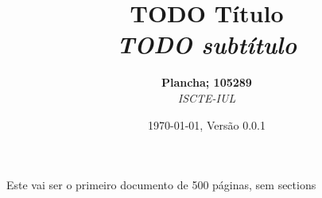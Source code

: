 \documentclass[12pt]{diazessay}
\title{\textbf{TODO Título} \\ {\Large\itshape TODO subtítulo}}
\author{\textbf{Plancha; 105289} \\ \textit{ISCTE-IUL}}
\date{\today , Versão 0.0.1}
\begin{document}
\maketitle

Este vai ser o primeiro documento de 500 páginas, sem sections
\end{document}

